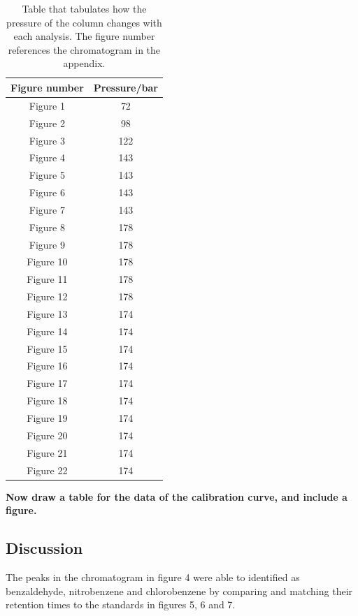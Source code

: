 \documentclass[a4paper, 12pt]{article}
\begin{document}
\begin{table}[h!]
	\centering
	\caption{Table that tabulates how the pressure of the column changes with each analysis. The figure number references the chromatogram in the appendix.}
	\begin{tabular}{|c|c|}
		\hline
		Figure number & Pressure/bar\\
		\hline
		Figure 1  & 72 \\ 
		\hline
		Figure 2 & 98 \\
		\hline
		Figure 3 & 122 \\
		\hline
		Figure 4 & 143 \\
		\hline
		Figure 5 & 143 \\
		\hline
		Figure 6 & 143 \\
		\hline
		Figure 7 & 143 \\
		\hline
		Figure 8 & 178 \\
		\hline
		Figure 9 & 178 \\
		\hline
		Figure 10 & 178 \\
		\hline
		Figure 11 & 178 \\
		\hline
		Figure 12 & 178 \\
		\hline
		Figure 13 & 174 \\
		\hline
		Figure 14 & 174 \\
		\hline
		Figure 15 & 174 \\
		\hline
		Figure 16 & 174 \\
		\hline
		Figure 17 & 174 \\
		\hline
		Figure 18 & 174 \\
		\hline
		Figure 19 & 174 \\
		\hline
		Figure 20 & 174 \\
		\hline
		Figure 21 & 174 \\
		\hline
		Figure 22 & 174 \\ 
		\hline
	\end{tabular}
	\label{tab-pressure}
\end{table}

\textbf{Now draw a table for the data of the calibration curve, and include a figure.}

\subsection{Discussion}
The peaks in the chromatogram in figure 4 were able to identified as benzaldehyde, nitrobenzene and chlorobenzene by comparing and matching their retention times to the standards in figures 5, 6 and 7. 
\end{document}
